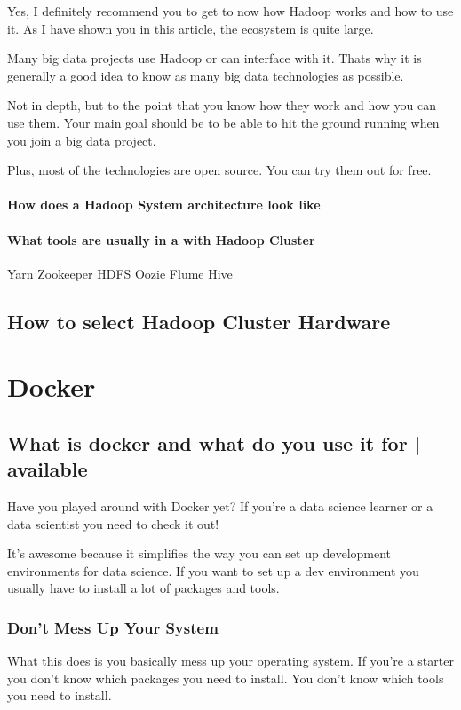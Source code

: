 \documentclass[12pt, numbers=noenddot]{scrreprt} %
\begin{document}
Yes, I definitely recommend you to get to now how Hadoop works and how to use it. As I have shown you in this article, the ecosystem is quite large.

Many big data projects use Hadoop or can interface with it. Thats why it is generally a good idea to know as many big data technologies as possible.

Not in depth, but to the point that you know how they work and how you can use them. Your main goal should be to be able to hit the ground running when you join a big data project.

Plus, most of the technologies are open source. You can try them out for free.
\subsubsection{How does a Hadoop System architecture look like}
\subsubsection{What tools are usually in a with Hadoop Cluster}
Yarn
Zookeeper
HDFS
Oozie
Flume
Hive
\section{How to select Hadoop Cluster Hardware}


\chapter{Docker}

\section{What is docker and what do you use it for | available}
Have you played around with Docker yet? If you’re a data science learner or a data scientist you need to check it out!

It’s awesome because it simplifies the way you can set up development environments for data science. If you want to set up a dev environment you usually have to install a lot of packages and tools.

\subsection{Don’t Mess Up Your System}

What this does is you basically mess up your operating system. If you’re a starter you don’t know which packages you need to install. You don’t know which tools you need to install.
\end{document}
